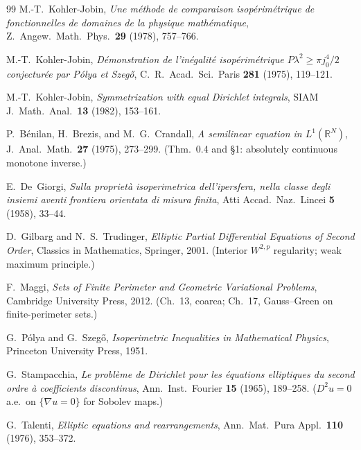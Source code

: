 \documentclass[11pt]{amsart}
\theoremstyle{definition}
\newcommand{\R}{\mathbb R}
\begin{document}
\begin{thebibliography}{99}
M.-T.~Kohler-Jobin,
\emph{Une m\'ethode de comparaison isop\'erim\'etrique de fonctionnelles de
domaines de la physique math\'ematique},
Z.\ Angew.\ Math.\ Phys.\ \textbf{29} (1978), 757--766.

M.-T.~Kohler-Jobin,
\emph{D\'emonstration de l'in\'egalit\'e isop\'erim\'etrique
\(P\lambda^2\ge\pi j_0^4/2\) conjectur\'ee par P\'olya et Szeg\H{o}},
C.\ R.\ Acad.\ Sci.\ Paris \textbf{281} (1975), 119--121.

M.-T.~Kohler-Jobin,
\emph{Symmetrization with equal Dirichlet integrals},
SIAM J.\ Math.\ Anal.\ \textbf{13} (1982), 153--161.

P.~B\'enilan, H.~Brezis, and M.~G.~Crandall,
\emph{A semilinear equation in \(L^1(\R^N)\)},
J.~Anal.\ Math.\ \textbf{27} (1975), 273--299.
(Thm.~0.4 and \S1: absolutely continuous monotone inverse.)

E.~De~Giorgi,
\emph{Sulla propriet\`a isoperimetrica dell'ipersfera, nella classe degli
insiemi aventi frontiera orientata di misura finita},
Atti Accad.\ Naz.\ Lincei \textbf{5} (1958), 33--44.

D.~Gilbarg and N.~S.~Trudinger,
\emph{Elliptic Partial Differential Equations of Second Order},
Classics in Mathematics, Springer, 2001.
(Interior \(W^{2,p}\) regularity; weak maximum principle.)

F.~Maggi,
\emph{Sets of Finite Perimeter and Geometric Variational Problems},
Cambridge University Press, 2012.
(Ch.~13, coarea; Ch.~17, Gauss--Green on finite-perimeter sets.)

G.~P\'olya and G.~Szeg\H{o},
\emph{Isoperimetric Inequalities in Mathematical Physics},
Princeton University Press, 1951.

G.~Stampacchia,
\emph{Le probl\`eme de Dirichlet pour les \'equations elliptiques du second
ordre \`a coefficients discontinus},
Ann.\ Inst.\ Fourier \textbf{15} (1965), 189--258.
(\(D^2u=0\) a.e.\ on \(\{\nabla u=0\}\) for Sobolev maps.)

G.~Talenti,
\emph{Elliptic equations and rearrangements},
Ann.\ Mat.\ Pura Appl.\ \textbf{110} (1976), 353--372.

\end{thebibliography}
\end{document}
